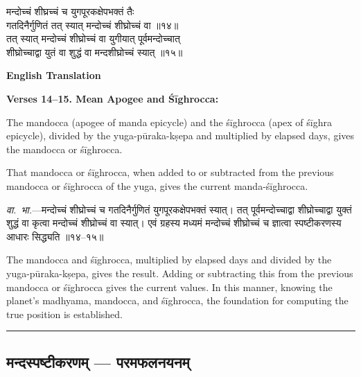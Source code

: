 \documentclass[11pt,a4paper]{article}
\newcommand{\longline}{\noindent\rule{\textwidth}{0.4pt}}
\newcommand{\dev}[1]{{\devanagarifont #1}}
\newcommand{\sectsep}{\par\vspace{0.8em}\longline\vspace{0.8em}}
\begin{document}
\vspace{0.5em}
\begin{minipage}[t]{0.48\textwidth}
\small\devanagarifont
मन्दोच्चं शीघ्रच्चं च युगपूरकक्षेपभक्तं तैः\\
गतदिनैर्गुणितं तत् स्यात् मन्दोच्चं शीघ्रोच्चं वा ॥१४॥\\[0.5em]
तत् स्यात् मन्दोच्चं शीघ्रोच्चं वा युगीयात् पूर्वमन्दोच्चात्\\
शीघ्रोच्चाद्वा युतं वा शुद्धं वा मन्दशीघ्रोच्चं स्यात् ॥१५॥
\end{minipage}%
\hfill
\begin{minipage}[t]{0.48\textwidth}
\textbf{\small English Translation}

\textbf{Verses 14--15. Mean Apogee and \'S\=ighrocca:}

The mandocca (apogee of manda epicycle) and the \'s\=ighrocca (apex of \'s\=ighra epicycle), divided by the yuga-p\=uraka-k\d{s}epa and multiplied by elapsed days, gives the mandocca or \'s\=ighrocca.

That mandocca or \'s\=ighrocca, when added to or subtracted from the previous mandocca or \'s\=ighrocca of the yuga, gives the current manda-\'s\=ighrocca.
\end{minipage}

\vspace{0.5em}
\begin{minipage}[t]{0.48\textwidth}
\small\devanagarifont
\textit{वा.~भा.}---मन्दोच्चं शीघ्रोच्चं च गतदिनैर्गुणितं युगपूरकक्षेपभक्तं स्यात्। तत् पूर्वमन्दोच्चाद्वा शीघ्रोच्चाद्वा युक्तं शुद्धं वा कृत्वा मन्दोच्चं शीघ्रोच्चं वा स्यात्। एवं ग्रहस्य मध्यमं मन्दोच्चं शीघ्रोच्चं च ज्ञात्वा स्पष्टीकरणस्य आधारः सिद्ध्यति ॥१४--१५॥
\end{minipage}%
\hfill
\begin{minipage}[t]{0.48\textwidth}
\small
The mandocca and \'s\=ighrocca, multiplied by elapsed days and divided by the yuga-p\=uraka-k\d{s}epa, gives the result. Adding or subtracting this from the previous mandocca or \'s\=ighrocca gives the current values. In this manner, knowing the planet's madhyama, mandocca, and \'s\=ighrocca, the foundation for computing the true position is established.
\end{minipage}

\sectsep

\subsection{\dev{मन्दस्पष्टीकरणम् --- परमफलनयनम्}}
\label{subsec:manda-spashtikarana}
\end{document}
